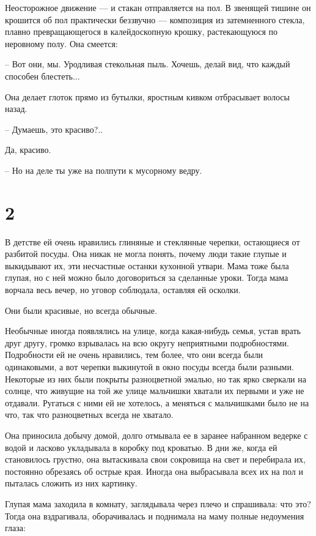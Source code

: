 \documentclass[a5paper]{article}
\begin{document}
Неосторожное движение --- и стакан отправляется на пол. В звенящей тишине он крошится об пол практически беззвучно --- композиция из затемненного стекла, плавно превращающегося в калейдоскопную крошку, растекающуюся по неровному полу. Она смеется:

-- Вот они, мы. Уродливая стекольная пыль. Хочешь, делай вид, что каждый способен блестеть...

Она делает глоток прямо из бутылки, яростным кивком отбрасывает волосы назад.

-- Думаешь, это красиво?..

Да, красиво.

-- Но на деле ты уже на полпути к мусорному ведру.

\section*{2}

В детстве ей очень нравились глиняные и стеклянные черепки, остающиеся от разбитой посуды. Она никак не могла понять, почему люди такие глупые и выкидывают их, эти несчастные останки кухонной утвари. Мама тоже была глупая, но с ней можно было договориться за сделанные уроки. Тогда мама ворчала весь вечер, но уговор соблюдала, оставляя ей осколки.

Они были красивые, но всегда обычные.

Необычные иногда появлялись на улице, когда какая-нибудь семья, устав врать друг другу, громко взрывалась на всю округу неприятными подробностями. Подробности ей не очень нравились, тем более, что они всегда были одинаковыми, а вот черепки выкинутой в окно посуды всегда были разными. Некоторые из них были покрыты разноцветной эмалью, но так ярко сверкали на солнце, что живущие на той же улице мальчишки хватали их первыми и уже не отдавали. Ругаться с ними ей не хотелось, а меняться с мальчишками было не на что, так что разноцветных всегда не хватало.

Она приносила добычу домой, долго отмывала ее в заранее набранном ведерке с водой и ласково укладывала в коробку под кроватью. В дни же, когда ей становилось грустно, она вытаскивала свои сокровища на свет и перебирала их, постоянно обрезаясь об острые края. Иногда она выбрасывала всех их на пол и пыталась сложить из них картинку.

Глупая мама заходила в комнату, заглядывала через плечо и спрашивала: что это? Тогда она вздрагивала, оборачивалась и поднимала на маму полные недоумения глаза:
\end{document}
